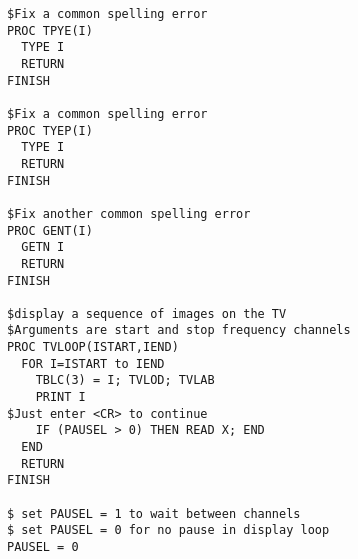 \documentclass[12pt,twoside]{article}
\begin{document}
\begin{verbatim}
$Fix a common spelling error 
PROC TPYE(I)
  TYPE I
  RETURN
FINISH

$Fix a common spelling error 
PROC TYEP(I)
  TYPE I
  RETURN
FINISH

$Fix another common spelling error 
PROC GENT(I)
  GETN I
  RETURN
FINISH

$display a sequence of images on the TV
$Arguments are start and stop frequency channels
PROC TVLOOP(ISTART,IEND)
  FOR I=ISTART to IEND 
    TBLC(3) = I; TVLOD; TVLAB
    PRINT I
$Just enter <CR> to continue
    IF (PAUSEL > 0) THEN READ X; END
  END
  RETURN
FINISH

$ set PAUSEL = 1 to wait between channels
$ set PAUSEL = 0 for no pause in display loop
PAUSEL = 0
\end{verbatim}  
\end{document}
